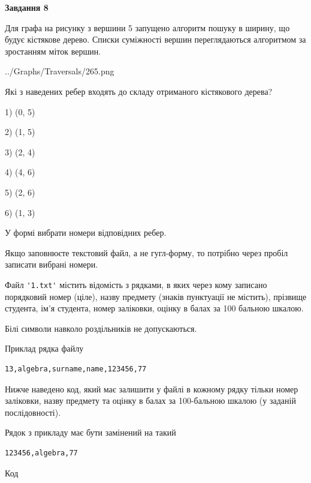 \documentclass[12pt, ukrainian]{article}
\def\code#1{\Verb!#1!}
\begin{document}
{\begin {large}
{\begin {center}\textbf{Завдання 8}\end {center}}\par
Для графа на рисунку з вершини 5 запущено алгоритм пошуку в ширину, що будує кістякове дерево. Списки суміжності вершин переглядаються алгоритмом за зростанням міток вершин.\par
\begin{center}
	{../Graphs/Traversals/265.png}
\end{center}
\par Які з наведених ребер входять до складу отриманого кістякового дерева?\par
1) (0, 5)\par
2) (1, 5)\par
3) (2, 4)\par
4) (4, 6)\par
5) (2, 6)\par
6) (1, 3)\par
{\vskip 15pt} У формі вибрати номери відповідних ребер.


Якщо заповнюєте текстовий файл, а не гугл-форму, то потрібно через пробіл записа\-ти вибрані номери.\par
\newpage


Файл \code{'1.txt'} містить відомість з рядками, в яких через кому записа\-но поряд\-ковий номер (ціле), назву предмету (знаків пунктуації не містить), прізвище студента, ім'я студента, номер заліковки, оцінку в балах за 100 бальною шкалою.

Білі символи навколо роздільників не допускаються.

Приклад рядка файлу



\begin{verbatim}
13,algebra,surname,name,123456,77
\end{verbatim}


Нижче наведено код, який має залишити у файлі в кожному рядку тільки номер заліковки, назву предмету та оцінку в балах за 100-бальною шкалою (у заданій послі\-дов\-ності).

Рядок з прикладу має бути замінений на такий



\begin{verbatim}
123456,algebra,77
\end{verbatim}




Код




\end{large}}
\end{document}
